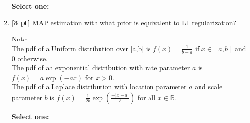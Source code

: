 \documentclass{article}
\newcommand{\blackcircle}{\tikz\draw[black,fill=black] (0,0) circle (1ex);}
\renewcommand{\circle}{\tikz\draw[black] (0,0) circle (1ex);}
\begin{document}
\begin{enumerate}
    \textbf{Select one:}
    
    \clearpage
    
    \item \textbf{[3 pt]} MAP estimation with what prior is equivalent to L1 regularization? 

    Note:\\
    The pdf of a Uniform distribution over [a,b] is $f(x) = \frac{1}{b-a}$ if $x \in [a,b]$ and 0 otherwise.\\
    The pdf of an exponential distribution with rate parameter $a$ is $f(x) = a \exp(-a x)$ for $x > 0$.\\
    The pdf of a Laplace distribution with location parameter $a$ and scale parameter $b$  is $f(x) = \frac{1}{2b} \exp \left( \frac{- |x - a| }{b} \right)$ for all $x \in \mathbb{R}$.
    

    \textbf{Select one:}
    
\end{enumerate}

\clearpage
\end{document}
